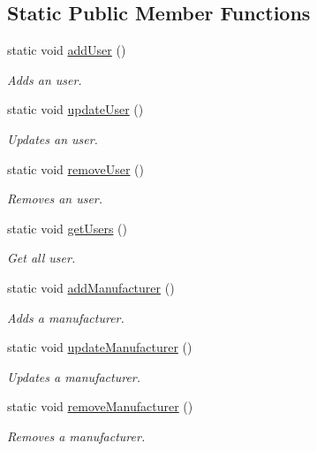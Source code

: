 \subsection*{\-Static \-Public \-Member \-Functions}
\begin{DoxyCompactItemize}
\item 
static void \hyperlink{class_testing_aad1e306b833922b5e4c7e9a4c89f0773}{add\-User} ()
\begin{DoxyCompactList}\small\item\em \-Adds an user. \end{DoxyCompactList}\item 
static void \hyperlink{class_testing_af565528fc8d31f1c15024937376a0429}{update\-User} ()
\begin{DoxyCompactList}\small\item\em \-Updates an user. \end{DoxyCompactList}\item 
static void \hyperlink{class_testing_ac92bc1242e7570e12b2e83780cc90dd2}{remove\-User} ()
\begin{DoxyCompactList}\small\item\em \-Removes an user. \end{DoxyCompactList}\item 
static void \hyperlink{class_testing_a53fc63ff5b7da6641027101a741f3a03}{get\-Users} ()
\begin{DoxyCompactList}\small\item\em \-Get all user. \end{DoxyCompactList}\item 
static void \hyperlink{class_testing_afd21dd51e60a8da41efe19f0a01d4bc6}{add\-Manufacturer} ()
\begin{DoxyCompactList}\small\item\em \-Adds a manufacturer. \end{DoxyCompactList}\item 
static void \hyperlink{class_testing_a54eb2aa5172347b766234fae46c4d11e}{update\-Manufacturer} ()
\begin{DoxyCompactList}\small\item\em \-Updates a manufacturer. \end{DoxyCompactList}\item 
static void \hyperlink{class_testing_adb38ceb7839918bc57d5f0751379c311}{remove\-Manufacturer} ()
\begin{DoxyCompactList}\small\item\em \-Removes a manufacturer. \end{DoxyCompactList}\item 

\end{DoxyCompactItemize}

